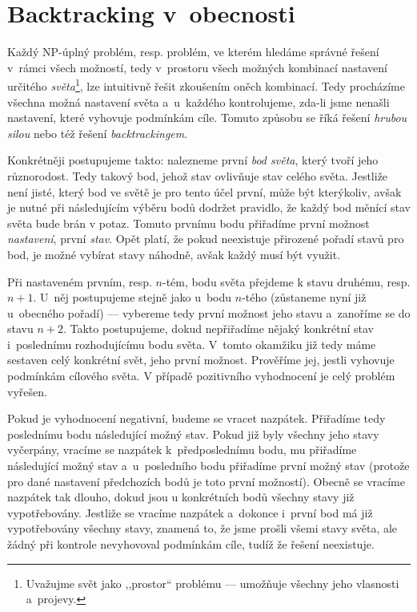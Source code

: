 \documentclass[11pt, titlepage]{report}
\begin{document}
\section{Backtracking v~obecnosti}
\label{sec:bck-obecne}

Každý NP-úplný problém, resp. problém, ve kterém hledáme správné řešení v~rámci všech možností, tedy v~prostoru všech možných kombinací nastavení určitého \emph{světa}\footnote{Uvažujme svět jako ,,prostor`` problému --- umožňuje všechny jeho vlasnosti a~projevy.}, lze intuitivně řešit zkoušením oněch kombinací. Tedy procházíme všechna možná nastavení světa a~u~každého kontrolujeme, zda-li jsme nenašli nastavení, které vyhovuje podmínkám cíle. Tomuto způsobu se říká řešení \emph{hrubou silou} nebo též řešení \emph{backtrackingem}.

Konkrétněji postupujeme takto: nalezneme první \emph{bod světa}, který tvoří jeho různorodost. Tedy takový bod, jehož stav ovlivňuje stav celého světa. Jestliže není jisté, který bod ve světě je pro tento účel první, může být kterýkoliv, avšak je nutné při následujícím výběru bodů dodržet pravidlo, že každý bod měnící stav světa bude brán v potaz. Tomuto prvnímu bodu přiřadíme první možnost \emph{nastavení}, první \emph{stav}. Opět platí, že pokud neexistuje přirozené pořadí stavů pro bod, je možné vybírat stavy náhodně, avšak každý musí být využit.

Při nastaveném prvním, resp. $n$-tém, bodu světa přejdeme k stavu druhému, resp. $n + 1$. U~něj postupujeme stejně jako u~bodu $n$-tého (zůstaneme nyní již u~obecného pořadí) --- vybereme tedy první možnost jeho stavu a~zanoříme se do stavu $n + 2$. Takto postupujeme, dokud nepřiřadíme nějaký konkrétní stav i~poslednímu rozhodujícímu bodu světa. V~tomto okamžiku již tedy máme sestaven celý konkrétní svět, jeho první možnost. Prověříme jej, jestli vyhovuje podmínkám cílového světa. V případě pozitivního vyhodnocení je celý problém vyřešen.

Pokud je vyhodnocení negativní, budeme se vracet nazpátek. Přiřadíme tedy poslednímu bodu následující možný stav. Pokud již byly všechny jeho stavy vyčerpány, vracíme se nazpátek k~předposlednímu bodu, mu přiřadíme následující možný stav a~u~posledního bodu přiřadíme první možný stav (protože pro dané nastavení předchozích bodů je toto první možností). Obecně se vracíme nazpátek tak dlouho, dokud jsou u konkrétních bodů všechny stavy již vypotřebovány. Jestliže se vracíme nazpátek a~dokonce i~první bod má již vypotřebovány všechny stavy, znamená to, že jsme prošli všemi stavy světa, ale žádný při kontrole nevyhovoval podmínkám cíle, tudíž že řešení neexistuje.
\end{document}
